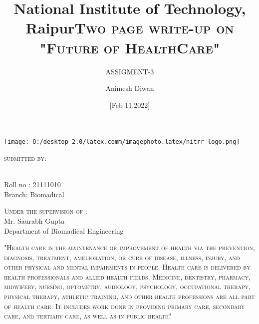 \documentclass[12pt]{article}
\begin{document}
\title{National Institute of Technology, Raipur}



\author{ASSIGMENT-3}


\date{[Feb 11,2022]}





\maketitle
\centering
\title{\textsc{\large    Two page write-up on "Future of HealthCare"} }


\texttt{[image: O:/desktop 2.0/latex.comm/imagephoto.latex/nitrr logo.png]}
\centering

\begin{flushleft}	
\textsc{\large submitted by:}\\   
\author{Animesh Diwan}\\
[0.2cm]
Roll no : 21111010\\
[0.2cm]
Branch: Biomadical\\
[0.4cm]
\end{flushleft}       
\begin{flushright}
\textsc{\large Under the supervision of :}\\
Mr. Saurabh Gupta \\
Department of Biomadical Engineering\\
\end{flushright}


\newpage


\tableofcontents

\pagebreak 




\textsc{\small "Health care is the maintenance or improvement of health via the prevention, diagnosis, treatment, amelioration, or cure of disease, illness, injury, and other physical and mental impairments in people. Health care is delivered by health professionals and allied health fields. Medicine, dentistry, pharmacy, midwifery, nursing, optometry, audiology, psychology, occupational therapy, physical therapy, athletic training, and other health professions are all part of health care. It includes work done in providing primary care, secondary care, and tertiary care, as well as in public health" }
\end{document}
